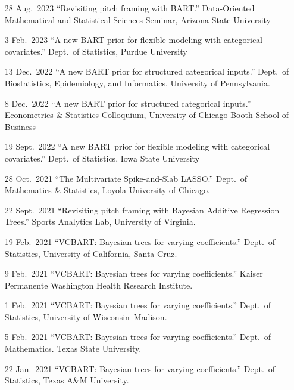 \documentclass[margin]{res}
\begin{document}
\begin{resume}
{\begin{itemize}
\item[28 Aug.~2023]{``Revisiting pitch framing with BART.'' Data-Oriented Mathematical and Statistical Sciences Seminar, Arizona State University}

\item[3 Feb.~2023]{``A new BART prior for flexible modeling with categorical covariates.'' Dept.~of Statistics, Purdue University}

\item[13 Dec.~2022]{``A new BART prior for structured categorical inputs.'' Dept.~of Biostatistics, Epidemiology, and Informatics, University of Pennsylvania.}

\item[8 Dec.~2022]{``A new BART prior for structured categorical inputs.'' Econometrics \& Statistics Colloquium, University of Chicago Booth School of Business}

\item[19 Sept.~2022]{``A new BART prior for flexible modeling with categorical covariates.'' Dept.~of Statistics, Iowa State University}

\item[28 Oct.~2021]{``The Multivariate Spike-and-Slab LASSO.'' Dept.~of Mathematics \& Statistics, Loyola University of Chicago.}

\item[22 Sept.~2021]{``Revisiting pitch framing with Bayesian Additive Regression Trees.'' Sports Analytics Lab, University of Virginia.}

\item[19 Feb.~2021]{``VCBART: Bayesian trees for varying coefficients.'' Dept.~of Statistics, University of California, Santa Cruz.}

\item[9 Feb.~2021]{``VCBART: Bayesian trees for varying coefficients.'' Kaiser Permanente Washington Health Research Institute.}

\item[1 Feb.~2021]{``VCBART: Bayesian trees for varying coefficients.'' Dept.~of Statistics, University of Wisconsin--Madison.}

\item[5 Feb.~2021]{``VCBART: Bayesian trees for varying coefficients.'' Dept.~of Mathematics. Texas State University.}

\item[22 Jan.~2021]{``VCBART: Bayesian trees for varying coefficients.'' Dept.~of Statistics, Texas A\&M University.}


\end{itemize}}
\end{resume}
\end{document}
